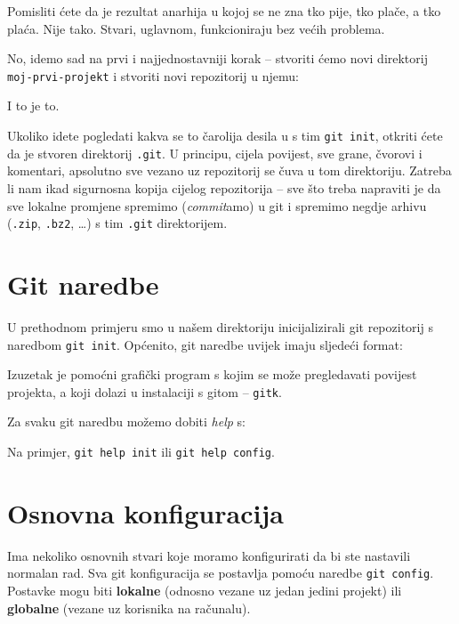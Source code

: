 Pomisliti ćete da je rezultat anarhija u kojoj se ne zna tko pije, tko plače, a tko plaća. 
Nije tako.
Stvari, uglavnom, funkcioniraju bez većih problema.

No, idemo sad na prvi i najjednostavniji korak -- stvoriti ćemo novi direktorij \\ \verb+moj-prvi-projekt+ i stvoriti novi repozitorij u njemu:



I to je to. 

Ukoliko idete pogledati kakva se to čarolija desila u s tim \verb+git init+, otkriti ćete da je stvoren direktorij \verb+.git+.
U principu, cijela povijest, sve grane, čvorovi i komentari, apsolutno sve vezano uz repozitorij se čuva u tom direktoriju.
Zatreba li nam ikad sigurnosna kopija cijelog repozitorija -- sve što treba napraviti je da sve lokalne promjene spremimo (\emph{commit}amo) u git i spremimo negdje arhivu (\verb+.zip+, \verb+.bz2+, \dots) s tim \verb+.git+ direktorijem.

\section*{Git naredbe}

U prethodnom primjeru smo u našem direktoriju inicijalizirali git repozitorij s naredbom \verb+git init+.
Općenito, git naredbe uvijek imaju sljedeći format:

\gitoutput{
\color{blue}{git $<$komanda$>$ $<$opcija1$>$ $<$opcija2$>$ \dots}
}

Izuzetak je pomoćni grafički program s kojim se može pregledavati povijest projekta, a koji dolazi u instalaciji s gitom -- \verb+gitk+.

Za svaku git naredbu možemo dobiti \emph{help} s:


Na primjer, \verb+git help init+ ili \verb+git help config+.

\section*{Osnovna konfiguracija}

Ima nekoliko osnovnih stvari koje moramo konfigurirati da bi ste nastavili normalan rad. 
Sva git konfiguracija se postavlja pomoću naredbe \verb+git config+. 
Postavke mogu biti \textbf{lokalne} (odnosno vezane uz jedan jedini projekt) ili \textbf{globalne} (vezane uz korisnika na računalu).

